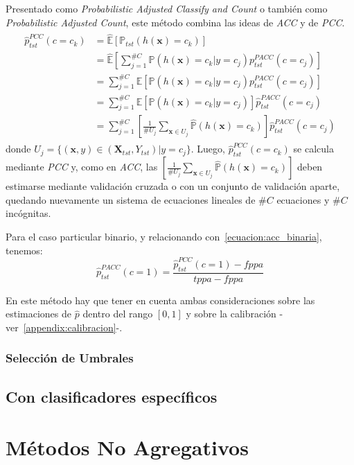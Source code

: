 Presentado como {\it Probabilistic Adjusted Classify and Count\/} o también como
{\it Probabilistic Adjusted Count}, este método combina las ideas de {\it ACC\/}
y de {\it PCC}.
\begin{align}
\begin{split}
    \hat p^{PCC}_{tst}(c=c_k) &= \mathbb{\hat E}[\mathbb{P}_{tst}(h(\boldsymbol{x})=c_k)] \\
    &= \mathbb{\hat E}[\sum \limits_{j=1}^{\#C}{\mathbb{P}(h(\boldsymbol{x})=c_k|y=c_j) p^{PACC}_{tst}(c=c_j)}] \\
    &= \sum \limits_{j=1}^{\#C}\mathbb{\hat E}[{\mathbb{P}(h(\boldsymbol{x})=c_k|y=c_j) p^{PACC}_{tst}(c=c_j)}] \\
    &= \sum \limits_{j=1}^{\#C}\mathbb{\hat E}[{\mathbb{P}(h(\boldsymbol{x})=c_k|y=c_j)}] \hat p^{PACC}_{tst}(c=c_j) \\
    &= \sum \limits_{j=1}^{\#C} [\frac {1}{\#U_j} \sum_{\boldsymbol{x} \in U_j} \mathbb{\hat P}(h(\boldsymbol{x})=c_k)] \hat p^{PACC}_{tst}(c=c_j)
\end{split}
\end{align}
donde $U_j=\{(\boldsymbol{x}, y) \in (\boldsymbol{X}_{tst}, Y_{tst}) | y=c_j\}$.
Luego, $\hat p^{PCC}_{tst}(c=c_k)$ se calcula mediante {\it PCC\/} y, como en
{\it ACC}, las $[\frac {1}{\#U_j} \sum_{\boldsymbol{x} \in U_j}
\mathbb{\hat{P}}(h(\boldsymbol{x})=c_k)]$ deben estimarse mediante validación
cruzada o con un conjunto de validación aparte, quedando nuevamente un sistema
de ecuaciones lineales de $\#C$ ecuaciones y $\#C$ incógnitas.

Para el caso particular binario, y relacionando con~\ref{ecuacion:acc_binaria},
tenemos:
\begin{equation}
    \hat p^{PACC}_{tst}(c=1) = \frac{\hat p^{PCC}_{tst}(c=1)-fppa}{tppa-fppa}
\end{equation}

En este método hay que tener en cuenta ambas consideraciones sobre las
estimaciones de $\hat p$ dentro del rango $[0, 1]$ y sobre la calibración
-ver~\ref{appendix:calibracion}-.

\subsubsection{Selección de Umbrales}



\subsection{Con clasificadores específicos}

\section{Métodos No Agregativos}\label{puntual:no_agregativos}
